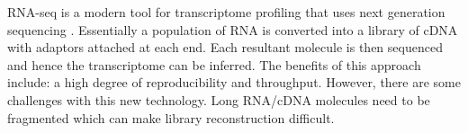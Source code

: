 \documentclass[float=false, crop=false]{standalone}
\begin{document}
	RNA-seq is a modern tool for transcriptome profiling that uses next generation sequencing \cite{Wang2009}. Essentially a population of RNA is converted into a library of cDNA with adaptors attached at each end. Each resultant molecule is then sequenced and hence the transcriptome can be inferred. The benefits of this approach include: a high degree of reproducibility and throughput. However, there are some challenges with this new technology. Long RNA/cDNA molecules need to be fragmented which can make library reconstruction difficult.  

	\ifstandalone
			
		
	\fi
\end{document}
